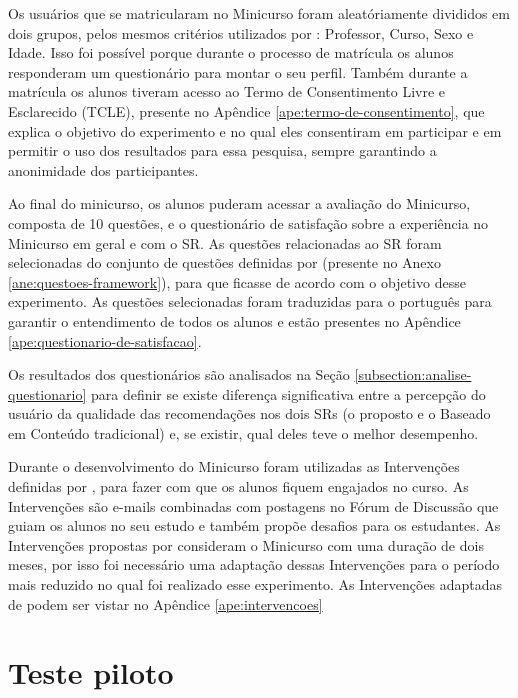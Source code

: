 Os usuários que se matricularam no Minicurso foram aleatóriamente divididos em dois grupos, pelos mesmos critérios
utilizados por : Professor, Curso, Sexo e Idade. Isso foi possível porque durante o processo de
matrícula os alunos responderam um questionário para montar o seu perfil. Também durante a matrícula os alunos tiveram
acesso ao Termo de Consentimento Livre e Esclarecido (TCLE), presente no Apêndice \ref{ape:termo-de-consentimento}, que
explica o objetivo do experimento e no qual eles consentiram em participar e em permitir o uso dos
resultados para essa pesquisa, sempre garantindo a anonimidade dos participantes.

Ao final do minicurso, os alunos puderam acessar a avaliação do Minicurso, composta de 10 questões, e o questionário
de satisfação sobre a experiência no Minicurso em geral e com o SR. As questões relacionadas ao SR foram selecionadas do
conjunto de questões definidas por  (presente no Anexo \ref{ane:questoes-framework}), para que
ficasse de acordo com o objetivo desse experimento. As questões selecionadas foram traduzidas para o português para garantir o entendimento de todos os alunos
e estão presentes no Apêndice \ref{ape:questionario-de-satisfacao}.

Os resultados dos questionários são analisados na Seção \ref{subsection:analise-questionario} para definir se existe diferença
significativa entre a percepção do usuário da qualidade das recomendações nos dois SRs (o proposto e o Baseado em Conteúdo tradicional) e, se existir,
qual deles teve o melhor desempenho.

Durante o desenvolvimento do Minicurso foram utilizadas as Intervenções definidas por , para
fazer com que os alunos fiquem engajados no curso. As Intervenções são e-mails combinadas com postagens no Fórum de Discussão
que guiam os alunos no seu estudo e também propõe desafios para os estudantes. As Intervenções propostas por 
consideram o Minicurso com uma duração de dois meses, por isso foi necessário uma adaptação dessas Intervenções para o período
mais reduzido no qual foi realizado esse experimento. As Intervenções adaptadas de  podem
ser vistar no Apêndice \ref{ape:intervencoes}

\section{Teste piloto}

